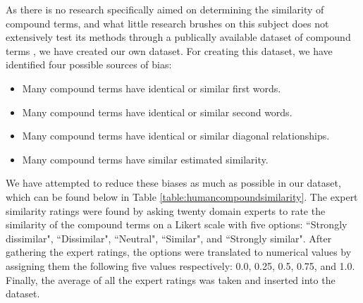 \documentclass{article}
\begin{document}
As there is no research specifically aimed on determining the similarity of compound terms, and what little research brushes on this subject does not extensively test its methods through a publically available dataset of compound terms \cite{jeong2009functional}, we have created our own dataset. For creating this dataset, we have identified four possible sources of bias:
\begin{itemize}
	\item Many compound terms have identical or similar first words.
	\item Many compound terms have identical or similar second words.
	\item Many compound terms have identical or similar diagonal relationships.
	\item Many compound terms have similar estimated similarity.
\end{itemize}
We have attempted to reduce these biases as much as possible in our dataset, which can be found below in Table \ref{table:humancompoundsimilarity}. The expert similarity ratings were found by asking twenty domain experts to rate the similarity of the compound terms on a Likert scale with five options: ``Strongly dissimilar", ``Dissimilar", ``Neutral", ``Similar", and ``Strongly similar". After gathering the expert ratings, the options were translated to numerical values by assigning them the following five values respectively: 0.0, 0.25, 0.5, 0.75, and 1.0. Finally, the average of all the expert ratings was taken and inserted into the dataset.
\end{document}
